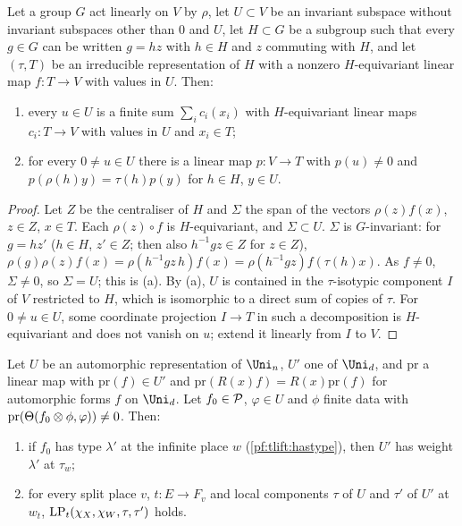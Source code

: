 \begin{lemma}\label{pf:tlift:absiso}
Let a group $G$ act linearly on $V$ by $\rho$, let $U\subset V$ be an invariant subspace without invariant subspaces other
than $0$ and $U$, let $H\subset G$ be a subgroup such that every $g\in G$ can be written $g=hz$ with $h\in H$ and $z$ commuting
with $H$, and let $(\tau,T)$ be an irreducible representation of $H$ with a nonzero $H$-equivariant linear map
$f\colon T\to V$ with values in $U$. Then:
\begin{enumerate}[label=(\alph*),nosep]
\item every $u\in U$ is a finite sum $\sum_ic_i(x_i)$ with $H$-equivariant linear maps $c_i\colon T\to V$ with values in
  $U$ and $x_i\in T$;
\item for every $0\ne u\in U$ there is a linear map $p\colon V\to T$ with $p(u)\ne0$ and $p(\rho(h)y)=\tau(h)p(y)$ for $h\in H$,
  $y\in U$.
\end{enumerate}
\end{lemma}

\begin{proof}
Let $Z$ be the centraliser of $H$ and $\Sigma$ the span of the vectors $\rho(z)f(x)$, $z\in Z$, $x\in T$. Each $\rho(z)\circ f$ is
$H$-equivariant, and $\Sigma\subset U$. $\Sigma$ is $G$-invariant: for $g=hz'$ ($h\in H$, $z'\in Z$; then also $h^{-1}gz\in Z$ for
$z\in Z$), $\rho(g)\rho(z)f(x)=\rho(h^{-1}gz\,h)f(x)=\rho(h^{-1}gz)f(\tau(h)x)$. As $f\ne0$, $\Sigma\ne0$, so $\Sigma=U$; this is (a).
By (a), $U$ is contained in the $\tau$-isotypic component $I$ of $V$ restricted to $H$, which is isomorphic to a direct
sum of copies of $\tau$. For $0\ne u\in U$, some coordinate projection $I\to T$ in such a decomposition is $H$-equivariant
and does not vanish on $u$; extend it linearly from $I$ to $V$.
\end{proof}

\begin{proposition}\label{pf:tlift:readlift}
Let $U$ be an automorphic representation of $\Uni_n$, $U'$ one of $\Uni_d$, and $\mathrm{pr}$ a linear map with $\mathrm{pr}(f)\in U'$ and
$\mathrm{pr}(R(x)f)=R(x)\mathrm{pr}(f)$ for automorphic forms $f$ on $\Uni_d$. Let $f_0\in\mathcal{P}$, $\varphi\in U$ and $\phi$ finite data with
$\mathrm{pr}(\Theta(f_0\otimes\phi,\varphi))\ne0$. Then:
\begin{enumerate}[label=(\alph*),nosep]
\item if $f_0$ has type $\lambda'$ at the infinite place $w$ (\cref{pf:tlift:hastype}), then $U'$ has weight $\lambda'$ at
  $\tau_w$;
\item for every split place $v$, $t\colon E\to F_v$ and local components $\tau$ of $U$ and $\tau'$ of $U'$ at $w_t$,
  $\mathrm{LP}_t(\chi_X,\chi_W,\tau,\tau')$ holds.
\end{enumerate}
\end{proposition}

